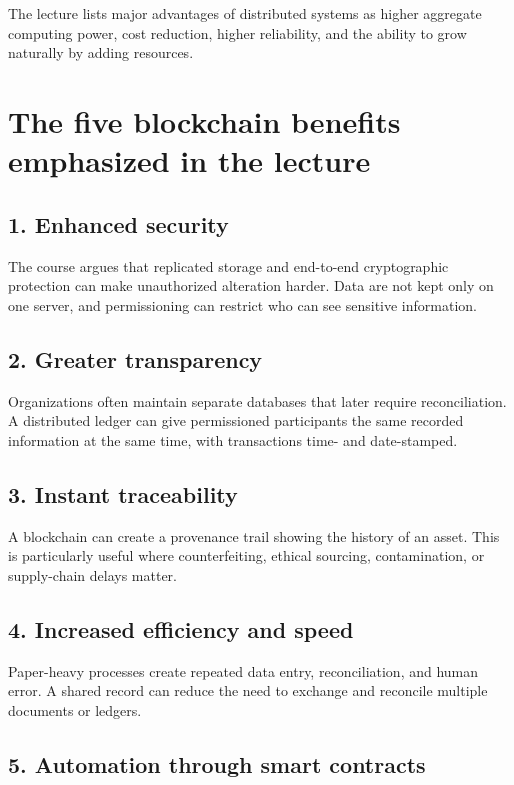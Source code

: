 The lecture lists major advantages of distributed systems as higher aggregate computing power, cost reduction, higher reliability, and the ability to grow naturally by adding resources.

\section{The five blockchain benefits emphasized in the lecture}

\subsection{1. Enhanced security}

The course argues that replicated storage and end-to-end cryptographic protection can make unauthorized alteration harder. Data are not kept only on one server, and permissioning can restrict who can see sensitive information.

\subsection{2. Greater transparency}

Organizations often maintain separate databases that later require reconciliation. A distributed ledger can give permissioned participants the same recorded information at the same time, with transactions time- and date-stamped.

\subsection{3. Instant traceability}

A blockchain can create a provenance trail showing the history of an asset. This is particularly useful where counterfeiting, ethical sourcing, contamination, or supply-chain delays matter.

\subsection{4. Increased efficiency and speed}

Paper-heavy processes create repeated data entry, reconciliation, and human error. A shared record can reduce the need to exchange and reconcile multiple documents or ledgers.

\subsection{5. Automation through smart contracts}


